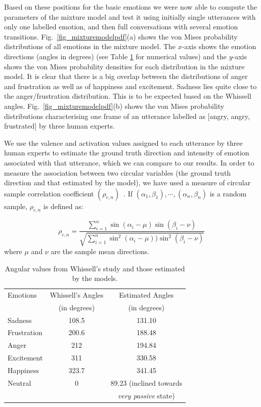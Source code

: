 \documentclass[10pt,journal,cspaper,compsoc]{IEEEtran}
\begin{document}
Based on these positions for the basic emotions we were now able to compute the parameters of the mixture model and test it using initially single utterances with only one labelled emotion, and then full conversations with several emotion transitions. Fig.~\ref{fig_mixturemodelpdf}(a) shows the von Mises probability distributions of all emotions in the mixture model. The $x$-axis shows the emotion directions (angles in degrees) (see Table \ref{tab:angles} for numerical values) and the $y$-axis shows the von Mises probability densities for each distribution in the mixture model. It is clear that there is a big overlap between the distributions of anger and frustration as well as of happiness and excitement. Sadness lies quite close to the anger/frustration distribution. This is to be expected based on the Whissell angles. Fig.~\ref{fig_mixturemodelpdf}(b) shows the von Mises probability distributions characterising one frame of an utterance labelled as [angry, angry, frustrated] by three human experts.

We use the valence and activation values assigned to each utterance by three human experts to estimate the ground truth direction and intensity of emotion associated with that utterance, which we can compare to our results. In order to measure the association between two circular variables (the ground truth direction and that estimated by the model), we have used a measure of circular sample correlation coefficient $(\rho_{c,n})$~\cite{jammalamadaka2001topics}. If $(\alpha_{1},\beta_{1}),\cdots,(\alpha_{n},\beta_{n})$ is a random sample, $\rho_{c,n}$ is defined as:

\begin{equation}
\rho_{c,n}=\frac{\sum \limits_{i=1}^n \sin(\alpha_{i}-\mu)\sin(\beta_{i}-\nu)}{\sqrt{ \sum \limits_{i=1}^n \sin^{2}(\alpha_{i}-\mu))\sin^{2}(\beta_{i}-\nu)}}
\end{equation}
where $\mu$ and $\nu$ are the sample mean directions.

\begin{table}[tp!]
\caption{Angular values from Whissell's study and those estimated by the models.}
\begin{center}
\begin{tabular}{|l|c|c|}
\hline
Emotions & Whissell's Angles & Estimated Angles \\
 & (in degrees) & (in degrees) \\
\hline
Sadness & 108.5 &  131.10  \\
\hline
Frustration & 200.6 &  188.48  \\
\hline
Anger & 212 &  194.84  \\
\hline
Excitement & 311 &  330.58  \\
\hline
Happiness & 323.7 &  341.45  \\
\hline
Neutral & 0 &   89.23 (inclined towards \\ 
 & & \emph{very passive} state) \\
\hline
\end{tabular}
\end{center}
\label{tab:angles}
\end{table}
\end{document}
